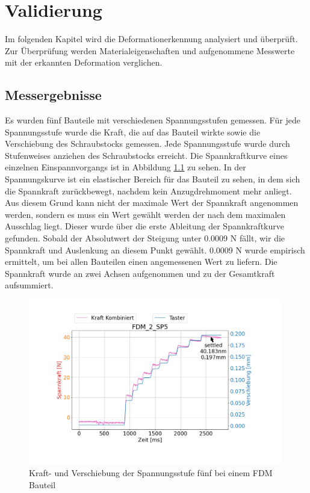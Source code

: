 
\chapter{Validierung}

Im folgenden Kapitel wird die Deformationerkennung analysiert und überprüft.
Zur Überprüfung werden Materialeigenschaften und aufgenommene Messwerte 
mit der erkannten Deformation verglichen.

\section{Messergebnisse}

Es wurden fünf Bauteile mit verschiedenen Spannungsstufen gemessen. Für jede 
Spannungsstufe wurde die Kraft, die auf das Bauteil wirkte sowie die Verschiebung 
des Schraubstocks gemessen.
Jede Spannungsstufe wurde durch Stufenweises anziehen des Schraubstocks erreicht.
Die Spannkraftkurve eines einzelnen Einspannvorgangs ist in 
Abbildung \ref{fig:single} zu sehen. 
In der Spannungskurve ist ein elastischer Bereich für das 
Bauteil zu sehen, in dem sich die Spannkraft zurückbewegt, nachdem kein 
Anzugdrehmoment mehr anliegt. Aus diesem Grund kann nicht der maximale Wert der Spannkraft angenommen werden, 
sondern es muss ein Wert gewählt werden der nach dem maximalen Ausschlag liegt.
Dieser wurde über die erste Ableitung der Spannkraftkurve gefunden. Sobald der 
Absolutwert der Steigung unter 0.0009 N fällt, wir die Spannkraft und Auslenkung an 
diesem Punkt gewählt. 0.0009 N wurde empirisch ermittelt, um bei allen Bauteilen einen 
angemessenen Wert zu liefern.
Die Spannkraft wurde an zwei Achsen aufgenommen und zu der Gesamtkraft aufsummiert.

\begin{figure}[H]
    \centering
    \includegraphics[width=0.99\textwidth]{images/spannkraftstufen_single.png}
    \caption{Kraft- und Verschiebung der Spannungsstufe fünf bei einem FDM Bauteil}
    \label{fig:single}
\end{figure}

